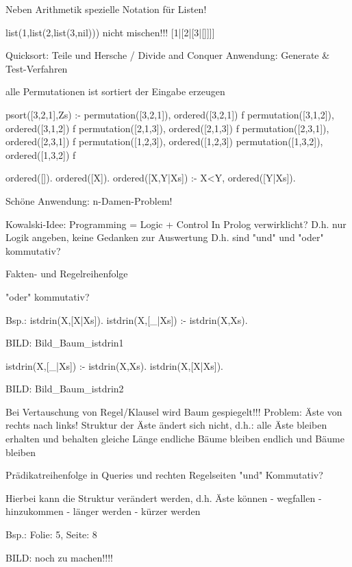 \usepackage{ wasysym }

Neben Arithmetik spezielle Notation für Listen!

list(1,list(2,list(3,nil)))
								nicht mischen!!!
[1|[2|[3|[]]]]

Quicksort: Teile und Hersche / Divide and Conquer
Anwendung: Generate & Test-Verfahren

alle Permutationen			ist sortiert
der Eingabe erzeugen

psort([3,2,1],Zs) :- permutation([3,2,1]), ordered([3,2,1]) f
					 permutation([3,1,2]), ordered([3,1,2]) f
					 permutation([2,1,3]), ordered([2,1,3]) f
					 permutation([2,3,1]), ordered([2,3,1]) f
					 permutation([1,2,3]), ordered([1,2,3]) \checked
					 permutation([1,3,2]), ordered([1,3,2]) f
					 
ordered([]).
ordered([X]).
ordered([X,Y|Xs]) :- X<Y, ordered([Y|Xs]).

Schöne Anwendung: n-Damen-Problem!



Kowalski-Idee: Programming = Logic + Control
			   In Prolog verwirklicht?
			   D.h. nur Logik angeben, keine Gedanken zur Auswertung
			   D.h. sind "und" und "oder" kommutativ?


Fakten- und Regelreihenfolge

"oder" kommutativ?

Bsp.:
istdrin(X,[X|Xs]).
istdrin(X,[_|Xs]) :- istdrin(X,Xs).


BILD: Bild_Baum_istdrin1


istdrin(X,[_|Xs]) :- istdrin(X,Xs).
istdrin(X,[X|Xs]).

BILD: Bild_Baum_istdrin2		   

Bei Vertauschung von Regel/Klausel wird Baum gespiegelt!!!
Problem: \infty Äste von rechts nach links!
Struktur der Äste ändert sich nicht, d.h.:
alle Äste bleiben erhalten und behalten gleiche Länge
\Rightarrow endliche Bäume bleiben endlich und \infty Bäume bleiben \infty


Prädikatreihenfolge in Queries und rechten Regelseiten "und" Kommutativ?

Hierbei kann die Struktur verändert werden,
d.h. Äste können
- wegfallen
- hinzukommen
- länger werden
- kürzer werden

Bsp.: Folie: 5, Seite: 8


BILD: noch zu machen!!!!











